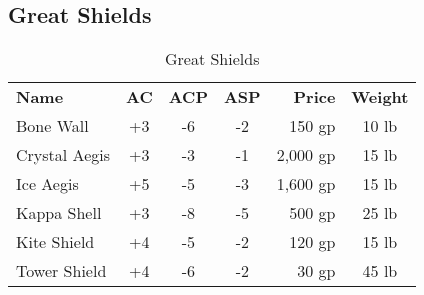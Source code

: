 
\subsection{Great Shields}

\begin{table}[htb]
\caption{Great Shields}
\centering
\begin{tabular}{l *{3}{c} r c}
\textbf{Name} & \textbf{AC} & \textbf{ACP} & \textbf{ASP} & \textbf{Price} & \textbf{Weight}\\
Bone Wall & +3 & -6 & -2 & 150 gp & 10 lb\\
Crystal Aegis & +3 & -3 & -1 & 2,000 gp & 15 lb\\
Ice Aegis & +5 & -5 & -3 & 1,600 gp & 15 lb\\
Kappa Shell & +3 & -8 & -5 & 500 gp & 25 lb\\
Kite Shield & +4  & -5 & -2 & 120 gp & 15 lb\\
Tower Shield & +4 & -6 & -2 & 30 gp & 45 lb\\
\end{tabular}
\end{table}

